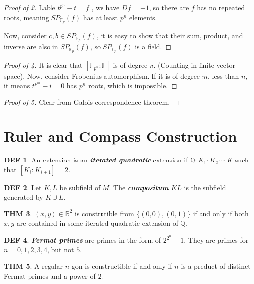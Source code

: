 \documentclass[twocolumn]{article}
\renewcommand{\emph}[1]{\textbf{\textit{#1}}}
\newcommand{\F}{\mathbb{F}}
\newcommand{\Q}{\mathbb{Q}}
\newcommand{\R}{\mathbb{R}}
\theoremstyle{definition}
\newtheorem{thm}{THM}
\newtheorem{defi}[thm]{DEF}
\theoremstyle{remark}
\begin{document}
\begin{proof}[Proof of 2]
	Lable $t^{p^n} - t = f$	, we have $Df = -1$, so there are $f$ has no repeated roots, meaning $SP_{\F_p}(f)$ has at least $p^n$ elements.

	Now, consider $a,b \in SP_{\F_p}(f)$, it is easy to show that their sum, product, and inverse are also in $SP_{\F_p}(f)$, so $SP_{\F_p}(f)$ is a field.
\end{proof}

\begin{proof}[Proof of 4]
	It is clear that $[\F_{p^n}:\F]$ is of degree $n$. (Counting in finite vector space). 
	Now, consider Frobenius automorphism.
	If it is of degree $m$, less than $n$, it means $t^{p^m} - t = 0$ has $p^n$ roots, which is impossible.
\end{proof}

\begin{proof} [Proof of 5]
	Clear from Galois correspondence theorem.
\end{proof}

\section{Ruler and Compass Construction}

\begin{defi}
	An extension is an \emph{iterated quadratic} extension if $\Q : K_1 : K_2 \cdots : K$ such that $[K_i : K_{i+1}] = 2$.
\end{defi}

\begin{defi}
	Let $K, L$ be subfield of $M$. The \emph{compositum} $KL$ is the subfield generated by $K \cup L$.
\end{defi}

\begin{thm}
	$(x,y) \in \R^2$ is construtible from $\{(0,0), (0, 1)\}$ if and only if both $x, y$ are contained in some iterated quadratic extension of $\Q$.
\end{thm}

\begin{defi}
	\emph{Fermat primes} are primes in the form of $2^{2^n} + 1$.
	They are primes for $n = 0, 1, 2, 3, 4$, but not $5$.
\end{defi}

\begin{thm}
	A regular $n$ gon is constructible if and only if $n$ is a product of distinct Fermat primes and a power of $2$.
\end{thm}
\end{document}
